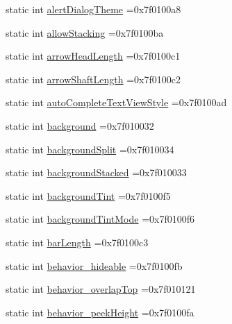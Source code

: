 \begin{DoxyCompactItemize}
\item 
static int \hyperlink{classandroid_1_1support_1_1design_1_1R_1_1attr_a7654c30f567e69029288754a31b69125}{alert\+Dialog\+Theme} =0x7f0100a8
\item 
static int \hyperlink{classandroid_1_1support_1_1design_1_1R_1_1attr_a12ec14191d9a3072180ffdf038577cae}{allow\+Stacking} =0x7f0100ba
\item 
static int \hyperlink{classandroid_1_1support_1_1design_1_1R_1_1attr_a38f5d34b48537f094d8b501291c0c882}{arrow\+Head\+Length} =0x7f0100c1
\item 
static int \hyperlink{classandroid_1_1support_1_1design_1_1R_1_1attr_a09d54a1db1a3a83fd7b444ad9a8942ea}{arrow\+Shaft\+Length} =0x7f0100c2
\item 
static int \hyperlink{classandroid_1_1support_1_1design_1_1R_1_1attr_aac0df944af42113f0bd554f81b7c03f4}{auto\+Complete\+Text\+View\+Style} =0x7f0100ad
\item 
static int \hyperlink{classandroid_1_1support_1_1design_1_1R_1_1attr_aeb618e21eef4362611649c7ca5a38343}{background} =0x7f010032
\item 
static int \hyperlink{classandroid_1_1support_1_1design_1_1R_1_1attr_a801eb11b48747bfa6b51d9658255cfec}{background\+Split} =0x7f010034
\item 
static int \hyperlink{classandroid_1_1support_1_1design_1_1R_1_1attr_a6b96e24534eaaeeed54585fb284f429e}{background\+Stacked} =0x7f010033
\item 
static int \hyperlink{classandroid_1_1support_1_1design_1_1R_1_1attr_ad5222449c1177317bb4170da3621846d}{background\+Tint} =0x7f0100f5
\item 
static int \hyperlink{classandroid_1_1support_1_1design_1_1R_1_1attr_a012eb62d26b9f9867a471ece462ff436}{background\+Tint\+Mode} =0x7f0100f6
\item 
static int \hyperlink{classandroid_1_1support_1_1design_1_1R_1_1attr_a38fc388c8d6cd00ce22d642ef15bb9b2}{bar\+Length} =0x7f0100c3
\item 
static int \hyperlink{classandroid_1_1support_1_1design_1_1R_1_1attr_a0dd161810c2e6f6a7dd186e8d3d7d290}{behavior\+\_\+hideable} =0x7f0100fb
\item 
static int \hyperlink{classandroid_1_1support_1_1design_1_1R_1_1attr_a8c200503a438286a0bccc4c94c42a7d1}{behavior\+\_\+overlap\+Top} =0x7f010121
\item 
static int \hyperlink{classandroid_1_1support_1_1design_1_1R_1_1attr_ac53824c6ca9d593963ac006a84e4d4b3}{behavior\+\_\+peek\+Height} =0x7f0100fa
\item 

\end{DoxyCompactItemize}

